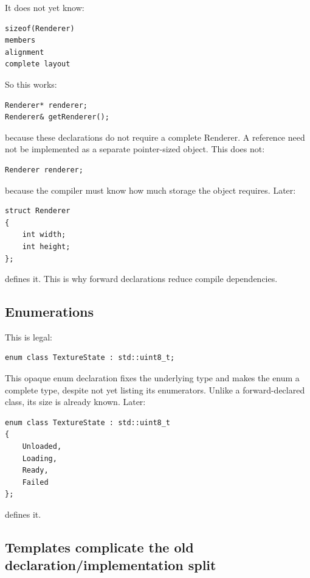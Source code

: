 It does not yet know:

\begin{verbatim}
sizeof(Renderer)
members
alignment
complete layout
\end{verbatim}

So this works:

\begin{verbatim}
Renderer* renderer;
Renderer& getRenderer();
\end{verbatim}

because these declarations do not require a complete Renderer. A reference need not be implemented as a separate pointer-sized object. This does not:

\begin{verbatim}
Renderer renderer;
\end{verbatim}

because the compiler must know how much storage the object requires. Later:

\begin{verbatim}
struct Renderer
{
    int width;
    int height;
};
\end{verbatim}

defines it. This is why forward declarations reduce compile dependencies.

\subsection{Enumerations}\label{05-engine-i-ch002-enumerations}

\hypertarget{05-engine-i-ch002-enumerations}{}

This is legal:

\begin{verbatim}
enum class TextureState : std::uint8_t;
\end{verbatim}

This opaque enum declaration fixes the underlying type and makes the enum a complete type, despite not yet listing its enumerators. Unlike a forward-declared class, its size is already known. Later:

\begin{verbatim}
enum class TextureState : std::uint8_t
{
    Unloaded,
    Loading,
    Ready,
    Failed
};
\end{verbatim}

defines it.

\subsection{Templates complicate the old declaration/implementation split}\label{05-engine-i-ch002-templates-complicate-the-old-declarationimplementation-split}

